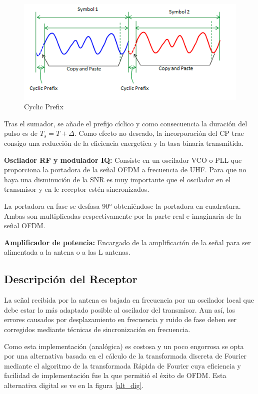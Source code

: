 \documentclass[a4paper,12pt]{report} %
\begin{document}
\begin{figure}[H]
	\centering
	\includegraphics[scale=1]{imagenes/arquitectura/CP}
	\caption{Cyclic Prefix}
	\label{CP}
\end{figure}

Tras el sumador, se añade el prefijo cíclico y como consecuencia la duración del pulso es de $T_s = T + \Delta$. Como efecto no deseado, la incorporación del CP trae consigo una reducción de la eficiencia energetica y la tasa binaria transmitida.

\textbf{Oscilador RF y modulador IQ:} Consiste en un oscilador VCO o PLL que proporciona la portadora de la señal OFDM a frecuencia de UHF. Para que no haya una disminución de la SNR es muy importante que el oscilador en el transmisor y en le receptor estén sincronizados.

La portadora en fase se desfasa 90° obteniéndose la portadora en cuadratura. Ambas son multiplicadas respectivamente por la parte real e imaginaria de la señal OFDM.

\textbf{Amplificador de potencia:} Encargado de la amplificación de la señal para ser alimentada a la antena o a las L antenas.

\subsection{Descripción del Receptor} %

La señal recibida por la antena es bajada en frecuencia por un oscilador local que debe estar lo más adaptado posible al oscilador del transmisor. Aun así, los errores causados por desplazamiento en frecuencia y ruido de fase deben ser corregidos mediante técnicas de sincronización en frecuencia.





Como esta implementación (analógica) es costosa y un poco engorrosa se opta por una alternativa basada en el cálculo de la transformada discreta de Fourier mediante el algoritmo de la transformada Rápida de Fourier cuya eficiencia y facilidad de implementación fue la que permitió el éxito de OFDM. Esta alternativa digital se ve en la figura \ref{alt_dig}.
\end{document}
